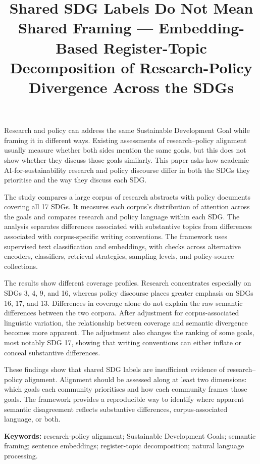 \documentclass[12pt,a4paper]{article}
\title{\textbf{Shared SDG Labels Do Not Mean Shared Framing --- Embedding-Based Register-Topic Decomposition of Research-Policy Divergence Across the SDGs}}
\author{}
\date{}
\renewenvironment{abstract}{%
  \par\addvspace{\baselineskip}%
  \noindent\textbf{\abstractname}\par\medskip
  \setlength{\parindent}{0pt}%
  \setlength{\leftskip}{0pt}%
  \setlength{\rightskip}{0pt}%
  \noindent\ignorespaces
}{%
  \par\addvspace{\baselineskip}%
}
\begin{document}
\maketitle
\thispagestyle{empty}
\clearpage
{}


\begin{abstract}
Research and policy can address the same Sustainable Development Goal while framing it in different ways. Existing assessments of research--policy alignment usually measure whether both sides mention the same goals, but this does not show whether they discuss those goals similarly. This paper asks how academic AI-for-sustainability research and policy discourse differ in both the SDGs they prioritise and the way they discuss each SDG.

The study compares a large corpus of research abstracts with policy documents covering all 17 SDGs. It measures each corpus's distribution of attention across the goals and compares research and policy language within each SDG. The analysis separates differences associated with substantive topics from differences associated with corpus-specific writing conventions. The framework uses supervised text classification and embeddings, with checks across alternative encoders, classifiers, retrieval strategies, sampling levels, and policy-source collections.

The results show different coverage profiles. Research concentrates especially on SDGs 3, 4, 9, and 16, whereas policy discourse places greater emphasis on SDGs 16, 17, and 13. Differences in coverage alone do not explain the raw semantic differences between the two corpora. After adjustment for corpus-associated linguistic variation, the relationship between coverage and semantic divergence becomes more apparent. The adjustment also changes the ranking of some goals, most notably SDG 17, showing that writing conventions can either inflate or conceal substantive differences.

These findings show that shared SDG labels are insufficient evidence of research--policy alignment. Alignment should be assessed along at least two dimensions: which goals each community prioritises and how each community frames those goals. The framework provides a reproducible way to identify where apparent semantic disagreement reflects substantive differences, corpus-associated language, or both.
\end{abstract}

\par\medskip\noindent\textbf{Keywords:} research-policy alignment; Sustainable Development Goals; semantic framing; sentence embeddings; register-topic decomposition; natural language processing.
\end{document}
